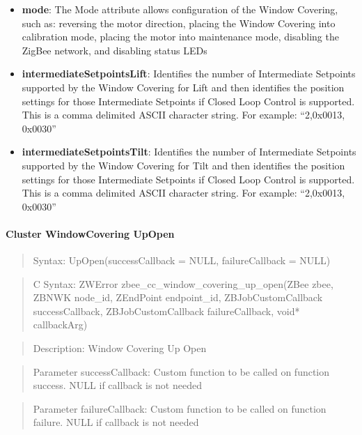 \begin{itemize}
\item \textbf{mode}: The Mode attribute allows configuration of the Window Covering, such as: reversing the motor direction, placing the Window Covering into calibration mode, placing the motor into maintenance mode, disabling the ZigBee network, and disabling status LEDs
\item \textbf{intermediateSetpointsLift}: Identifies the number of Intermediate Setpoints supported by the Window Covering for Lift and then identifies the position settings for those Intermediate Setpoints if Closed Loop Control is supported. This is a comma delimited ASCII character string. For example: “2,0x0013, 0x0030”
\item \textbf{intermediateSetpointsTilt}: Identifies the number of Intermediate Setpoints supported by the Window Covering for Tilt and then identifies the position settings for those Intermediate Setpoints if Closed Loop Control is supported. This is a comma delimited ASCII character string. For example: “2,0x0013, 0x0030”
\end{itemize}

\paragraph{Cluster WindowCovering UpOpen}
\begin{quote}Syntax: UpOpen(successCallback = NULL, failureCallback = NULL)\end{quote}
\begin{quote}C Syntax: ZWError zbee\_cc\_window\_covering\_up\_open(ZBee zbee, ZBNWK node\_id, ZEndPoint endpoint\_id, ZBJobCustomCallback successCallback, ZBJobCustomCallback failureCallback, void* callbackArg)\end{quote}
\begin{quote}Description: Window Covering Up Open\end{quote}
\begin{quote}Parameter successCallback: Custom function to be called on function success. NULL if callback is not needed\end{quote}
\begin{quote}Parameter failureCallback: Custom function to be called on function failure. NULL if callback is not needed\end{quote}


